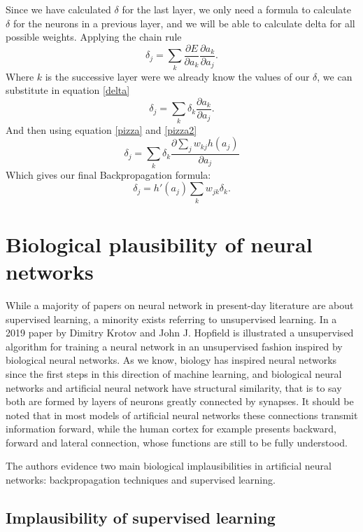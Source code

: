 \documentclass[a4paper]{report}
\begin{document}
Since we have calculated $\delta$ for the last layer, we only need a formula to calculate $\delta$ for the neurons in a previous layer, and we will be able to calculate delta for all possible weights.
Applying the chain rule
\begin{equation}
\delta_j = \sum_k \frac{\partial E}{\partial a_k} \frac{\partial a_k}{\partial a_j}.
\end{equation}
Where $k$ is the successive layer were we already know the values of our $\delta$, we can substitute in equation \ref{delta}
\begin{equation}
\delta_j = \sum_k\delta_k \frac{\partial a_k}{\partial a_j}.
\end{equation}
And then using equation \ref{pizza} and \ref{pizza2}
\begin{equation}
\delta_j = \sum_k \delta_k \frac{\partial \sum_j w_{kj} h(a_j)}{\partial a_j}
\end{equation}
Which gives our final Backpropagation formula:
\begin{equation}
\delta_j = h'(a_j)\sum_k w_{jk}\delta_k.
\end{equation}


\section{Biological plausibility of neural networks}
While a majority of papers on neural network in present-day literature are about supervised learning, a minority exists referring to unsupervised learning.
In a 2019 paper by Dimitry Krotov and John J.
Hopfield is illustrated a unsupervised algorithm for training a neural network in an unsupervised fashion inspired by biological neural networks.
As we know, biology has inspired neural networks since the first steps in this direction of machine learning, and biological neural networks and artificial neural network have structural similarity, that is to say both are formed by layers of neurons greatly connected by synapses.
It should be noted that in most models of artificial neural networks these connections transmit information forward, while the human cortex for example presents backward, forward and lateral connection, whose functions are still to be fully understood.

The authors evidence two main biological implausibilities in artificial neural networks:
backpropagation techniques and supervised learning.

\subsection{Implausibility of supervised learning}
\end{document}
